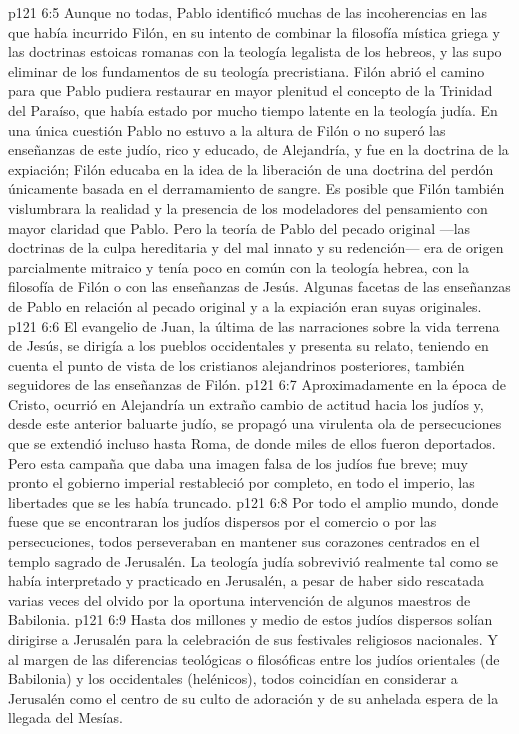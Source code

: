 \vs p121 6:5 Aunque no todas, Pablo identificó muchas de las incoherencias en las que había incurrido Filón, en su intento de combinar la filosofía mística griega y las doctrinas estoicas romanas con la teología legalista de los hebreos, y las supo eliminar de los fundamentos de su teología precristiana. Filón abrió el camino para que Pablo pudiera restaurar en mayor plenitud el concepto de la Trinidad del Paraíso, que había estado por mucho tiempo latente en la teología judía. En una única cuestión Pablo no estuvo a la altura de Filón o no superó las enseñanzas de este judío, rico y educado, de Alejandría, y fue en la doctrina de la expiación; Filón educaba en la idea de la liberación de una doctrina del perdón únicamente basada en el derramamiento de sangre. Es posible que Filón también vislumbrara la realidad y la presencia de los modeladores del pensamiento con mayor claridad que Pablo. Pero la teoría de Pablo del pecado original ---las doctrinas de la culpa hereditaria y del mal innato y su redención--- era de origen parcialmente mitraico y tenía poco en común con la teología hebrea, con la filosofía de Filón o con las enseñanzas de Jesús. Algunas facetas de las enseñanzas de Pablo en relación al pecado original y a la expiación eran suyas originales.
\vs p121 6:6 El evangelio de Juan, la última de las narraciones sobre la vida terrena de Jesús, se dirigía a los pueblos occidentales y presenta su relato, teniendo en cuenta el punto de vista de los cristianos alejandrinos posteriores, también seguidores de las enseñanzas de Filón.
\vs p121 6:7 \pc Aproximadamente en la época de Cristo, ocurrió en Alejandría un extraño cambio de actitud hacia los judíos y, desde este anterior baluarte judío, se propagó una virulenta ola de persecuciones que se extendió incluso hasta Roma, de donde miles de ellos fueron deportados. Pero esta campaña que daba una imagen falsa de los judíos fue breve; muy pronto el gobierno imperial restableció por completo, en todo el imperio, las libertades que se les había truncado.
\vs p121 6:8 Por todo el amplio mundo, donde fuese que se encontraran los judíos dispersos por el comercio o por las persecuciones, todos perseveraban en mantener sus corazones centrados en el templo sagrado de Jerusalén. La teología judía sobrevivió realmente tal como se había interpretado y practicado en Jerusalén, a pesar de haber sido rescatada varias veces del olvido por la oportuna intervención de algunos maestros de Babilonia.
\vs p121 6:9 Hasta dos millones y medio de estos judíos dispersos solían dirigirse a Jerusalén para la celebración de sus festivales religiosos nacionales. Y al margen de las diferencias teológicas o filosóficas entre los judíos orientales (de Babilonia) y los occidentales (helénicos), todos coincidían en considerar a Jerusalén como el centro de su culto de adoración y de su anhelada espera de la llegada del Mesías.
